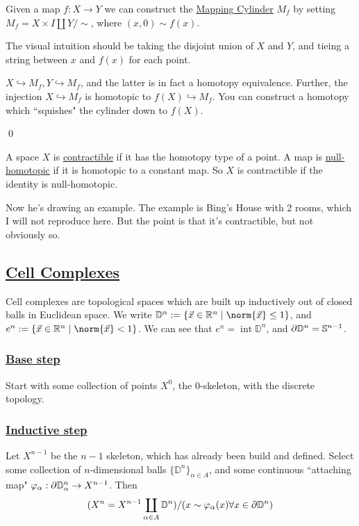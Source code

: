 \documentclass[x11names,reqno,14pt]{extarticle}
\begin{document}

Given a map $f:X\to Y$ we can construct the \underline{Mapping Cylinder} $M_f$ by setting $M_f = X \times I \coprod Y/\sim$, where $(x, 0) \sim f(x)$. 

The visual intuition should be taking the disjoint union of $X$ and $Y$, and tieing a string between $x$ and $f(x)$ for each point. 

\claim 
$X \hookrightarrow M_f, Y \hookrightarrow M_f$, and the latter is in fact a homotopy equivalence. Further, the injection $X \hookrightarrow M_f$ is homotopic to $f(X) \hookrightarrow M_f$. 
\proof
You can construct a homotopy which ``squishes" the cylinder down to $f(X)$. 

\qed


A space $X$ is \underline{contractible} if it has the homotopy type of a point. A map is \underline{null-homotopic} if it is homotopic to a constant map. So $X$ is contractible if the identity is null-homotopic. 

Now he's drawing an example. The example is Bing's House with 2 rooms, which I will not reproduce here. But the point is that it's contractible, but not obviously so. 

\subsection*{\underline{Cell Complexes}}

Cell complexes are topological spaces which are built up inductively out of closed balls in Euclidean space. We write $\mathbb{D}^n := \{\vec{x} \in \R^n \mid \norm{\vec{x}} \leq 1 \}$, and $e^n := \{\vec{x}\in\R^n \mid \norm{\vec{x}} < 1\}$. We can see that $e^n = \operatorname{int}\mathbb{D}^n$, and $\partial\mathbb{D}^n = \mathbb{S}^{n - 1}$. 

\subsubsection*{\underline{Base step}}

Start with some collection of points $X^0$, the $0$-skeleton, with the discrete topology.

\subsubsection*{\underline{Inductive step}}

Let $X^{n - 1}$ be the $n - 1$ skeleton, which has already been build and defined. Select some collection of $n$-dimensional balls $\{\mathbb{D}^n\}_{\alpha\in A}$, and some continuous ``attaching map" $\varphi_\alpha:\partial\mathbb{D}^n_\alpha\to X^{n - 1}$. Then 
\[
(X^n = X^{n - 1}\coprod_{\alpha\in A}\mathbb{D}^n )/(x \sim\varphi_\alpha(x)\forall x \in \partial\mathbb{D}^n)
\]
\end{document}
